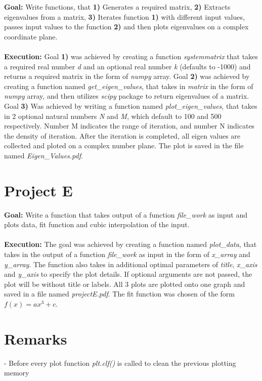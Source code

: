 \documentclass[a4paper,12pt]{article}
\begin{document}
\textbf{Goal:} Write functions, that \textbf{1)} Generates a required matrix, \textbf{2)} Extracts eigenvalues from a matrix, \textbf{3)} Iterates function \textbf{1)} with different input values, passes input values to the function \textbf{2)} and then plots eigenvalues on a complex coordinate plane. \\ \\ \textbf{Execution:} Goal \textbf{1)} was achieved by creating a function \textit{systemmatrix} that takes a required real number \textit{d} and an optional real number \textit{k} (defaults to -1000) and returns a required matrix in the form of \textit{numpy} array. Goal \textbf{2)} was achieved by creating a function named \textit{get\_eigen\_values}, that takes in \textit{matrix} in the form of \textit{numpy} array, and then utilizes \textit{scipy} package to return eigenvalues of a matrix. Goal \textbf{3)} Was achieved by writing a function named \textit{plot\_eigen\_values}, that takes in 2 optional natural numbers \textit{N} and \textit{M}, which default to 100 and 500 respectively. Number M indicates the range of iteration, and number N indicates the density of iteration. After the iteration is completed, all eigen values are collected and ploted on a complex number plane. The plot is saved in the file named \textit{Eigen\_Values.pdf}.

\section{Project E}

\textbf{Goal:} Write a function that takes output of a function \textit{file\_work} as input and plots data, fit function and cubic interpolation of the input. \\ \\ \textbf{Execution:} The goal was achieved by creating a function named \textit{plot\_data}, that takes in the output of a function \textit{file\_work} as input in the form of \textit{x\_array} and \textit{y\_array}. The function also takes in additional optimal parameters of \textit{title}, \textit{x\_axis} and \textit{y\_axis} to specify the plot details. If optional arguments are not passed, the plot will be without title or labels. All 3 plots are plotted onto one graph and saved in a file named \textit{projectE.pdf}. The fit function was chosen of the form $f(x)=ax^{3}+c$.

\section{Remarks}

- Before every plot function \textit{plt.clf()} is called to clean the previous plotting memory 
\end{document}
